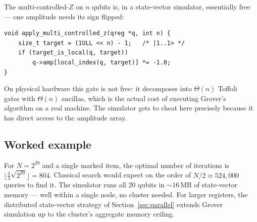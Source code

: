 The multi-controlled-$Z$ on $n$ qubits is, in a state-vector simulator, essentially free --- one amplitude needs its sign flipped:

\begin{lstlisting}[caption={Multi-controlled-$Z$ implementation in the simulator.}]
void apply_multi_controlled_z(qreg *q, int n) {
    size_t target = (1ULL << n) - 1;   /* |1..1> */
    if (target_is_local(q, target))
        q->amp[local_index(q, target)] *= -1.0;
}
\end{lstlisting}

On physical hardware this gate is not free: it decomposes into $\Theta(n)$ Toffoli gates with $\Theta(n)$ ancillas, which is the actual cost of executing Grover's algorithm on a real machine. The simulator gets to cheat here precisely because it has direct access to the amplitude array.

\subsection{Worked example}

For $N = 2^{20}$ and a single marked item, the optimal number of iterations is $\lfloor \tfrac{\pi}{4}\sqrt{2^{20}}\rfloor = 804$. Classical search would expect on the order of $N/2 \approx 524{,}000$ queries to find it. The simulator runs all $20$ qubits in $\sim 16\,\text{MB}$ of state-vector memory --- well within a single node, no cluster needed. For larger registers, the distributed state-vector strategy of Section~\ref{sec:parallel} extends Grover simulation up to the cluster's aggregate memory ceiling.
